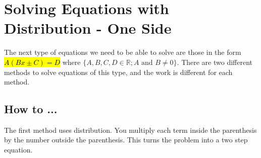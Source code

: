 \section{Solving Equations with Distribution - One Side}
The next type of equations we need to be able to solve are those in the form \hl{$A(Bx\pm C)=D$} where $\{A,B,C,D \in \mathbb{R}; A \textrm{ and } B\neq 0\}$. There are two different methods to solve equations of this type, and the work is different for each method.
\subsection{How to ...}
The first method uses distribution. You multiply each term inside the parenthesis by the number outside the parenthesis. This turns the problem into a two step equation.

